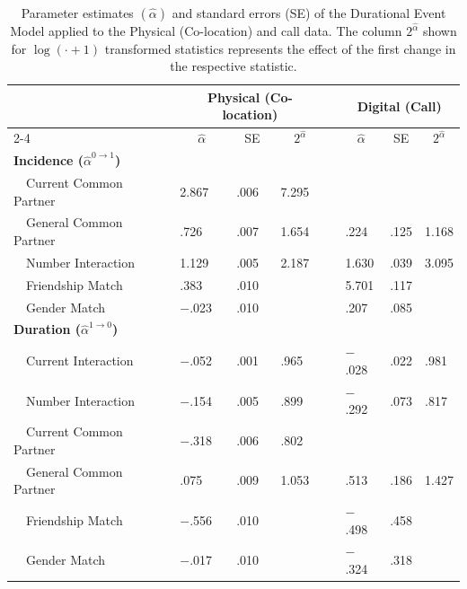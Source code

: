 \begin{table}[t!]
\caption{Parameter estimates $(\hat{\alpha})$ and standard errors (SE) of the Durational Event Model applied to the Physical (Co-location) and call data. The column $2^{\hat \alpha}$ shown for $\log(\cdot +1)$ transformed statistics represents the effect of the first change in the respective statistic. \label{tbl:results}} 
\begin{center}
\begin{tabular}{llllclll}
\hline
\multicolumn{1}{l}{\bfseries }&\multicolumn{3}{c}{\bfseries Physical (Co-location)}&\multicolumn{1}{l}{\bfseries }&\multicolumn{3}{c}{\bfseries Digital (Call)}\tabularnewline
\cline{2-4} \cline{6-8}
\multicolumn{1}{l}{}&\multicolumn{1}{c}{$\hat{\alpha}$}&\multicolumn{1}{c}{SE}&\multicolumn{1}{c}{$2^{\hat{\alpha}}$}&\multicolumn{1}{c}{}&\multicolumn{1}{c}{$\hat{\alpha}$}&\multicolumn{1}{c}{SE}&\multicolumn{1}{c}{$2^{\hat{\alpha}}$}\tabularnewline
\hline
{\bfseries Incidence ($\hat \alpha^{0\rightarrow 1}$)}&&&&&&&\tabularnewline
~~Current Common Partner&2.867&.006&7.295&&&&\tabularnewline
~~General Common Partner&.726&.007&1.654&&.224&.125&1.168\tabularnewline
~~Number Interaction&1.129&.005&2.187&&1.630&.039&3.095\tabularnewline
~~Friendship Match&.383&.010&&&5.701&.117&\tabularnewline
~~Gender Match&$-$.023&.010&&&.207&.085&\tabularnewline
\hline
{\bfseries Duration ($\hat \alpha^{1\rightarrow 0}$)}&&&&&&&\tabularnewline
~~Current Interaction&$-$.052&.001&.965&&$-$.028&.022&.981\tabularnewline
~~Number Interaction&$-$.154&.005&.899&&$-$.292&.073&.817\tabularnewline
~~Current Common Partner&$-$.318&.006&.802&&&&\tabularnewline
~~General Common Partner&.075&.009&1.053&&.513&.186&1.427\tabularnewline
~~Friendship Match&$-$.556&.010&&&$-$.498&.458&\tabularnewline
~~Gender Match&$-$.017&.010&&&$-$.324&.318&\tabularnewline
\hline
\end{tabular}\end{center}
\end{table}
